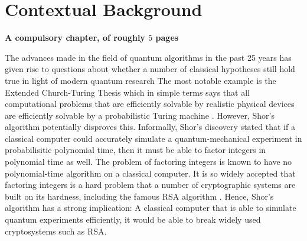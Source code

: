 \documentclass[ %
                    author={Manan Vaswani},
                supervisor={Dr. Raphael Clifford},
                    degree={MEng},
                     title={A multi-core CPU implementation \n of the classical Boson Sampling algorithm},
                  subtitle={},
                      type={},
                      year={2019} ]{dissertation}
\begin{document}

%

\mainmatter


\chapter{Contextual Background}
\label{chap:context}

{\bf A compulsory chapter,     of roughly $5$ pages}
\vspace{1cm} 

\noindent
The advances made in the field of quantum algorithms in the past 25 years has given rise to questions about whether a number of classical hypotheses still hold true in light of modern quantum research The most notable example is the Extended Church-Turing Thesis which in simple terms says that all computational problems that are efficiently solvable by realistic physical devices are efficiently solvable by a probabilistic Turing machine \cite{kaye2007}. However, Shor's algorithm \cite{shor1995} potentially disproves this. Informally, Shor's discovery stated that if a classical computer could accurately simulate a quantum-mechanical experiment in probabilisitic polynomial time, then it must be able to factor integers in polynomial time as well. The problem of factoring integers is known to have no polynomial-time algorithm on a classical computer. It is so widely accepted that factoring integers is a hard problem that a number of cryptographic systems are built on its hardness, including the famous RSA algorithm \cite{rsa1978}. Hence, Shor's algorithm has a strong implication: A classical computer that is able to simulate quantum experiments efficiently, it would be able to break widely used cryptosystems such as RSA.
\end{document}
